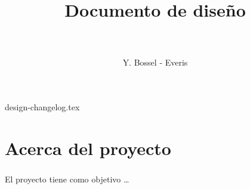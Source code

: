 \documentclass[11pt,letterpaper]{report}
\begin{document}

\begin{titlepage}
    \thispagestyle{empty}
    \title{\Huge\prjName{}\\[15px]\huge Documento de dise\~no\\{\tiny \prjVersion{}}\\[40px]}
    \author{Y. Bossel - Everis}
\end{titlepage}
\maketitle

\newpage
{}

{design-changelog.tex}

\newpage
\tableofcontents
\listoffigures

\newpage
{}

\chapter{Acerca del proyecto}
\paragraph{}
El proyecto tiene como objetivo \ldots
\end{document}
